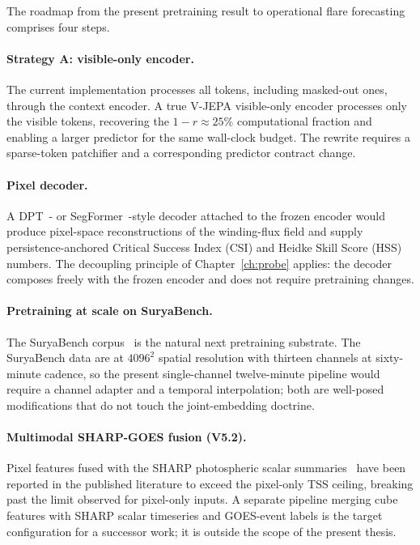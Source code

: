 The roadmap from the present pretraining result to operational
flare forecasting comprises four steps.

\paragraph{Strategy A: visible-only encoder.} The current
implementation processes all tokens, including masked-out ones,
through the context encoder. A true V-JEPA visible-only encoder
processes only the visible tokens, recovering the
$1{-}r \approx 25\%$ computational fraction and enabling a
larger predictor for the same wall-clock budget. The rewrite
requires a sparse-token patchifier and a corresponding predictor
contract change.

\paragraph{Pixel decoder.} A
DPT~\cite{ranftl2021dpt}- or
SegFormer~\cite{xie2021segformer}-style decoder attached to the
frozen encoder would produce pixel-space reconstructions of the
winding-flux field and supply persistence-anchored Critical
Success Index (CSI) and Heidke Skill Score (HSS) numbers. The decoupling principle of Chapter~\ref{ch:probe}
applies: the decoder composes freely with the frozen encoder and
does not require pretraining changes.

\paragraph{Pretraining at scale on SuryaBench.} The SuryaBench
corpus~\cite{suryabench2025} is the natural next pretraining
substrate. The SuryaBench data are at $4096^{2}$ spatial resolution
with thirteen channels at sixty-minute cadence, so the present
single-channel twelve-minute pipeline would require a channel
adapter and a temporal interpolation; both are well-posed
modifications that do not touch the joint-embedding doctrine.

\paragraph{Multimodal SHARP-GOES fusion (V5.2).} Pixel features
fused with the SHARP photospheric scalar
summaries~\cite{bobra2014sharp} have been reported in the
published literature to exceed the pixel-only TSS ceiling,
breaking past the limit observed for pixel-only inputs. A separate pipeline merging cube
features with SHARP scalar timeseries and GOES-event labels is the
target configuration for a successor work; it is outside the scope
of the present thesis.

